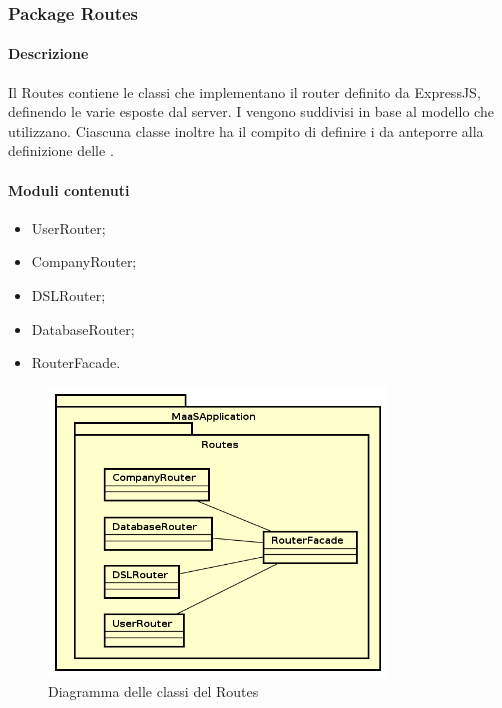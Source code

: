 \subsubsection{Package Routes}
\paragraph*{Descrizione}
Il  Routes contiene le classi che implementano il router definito da ExpressJS, definendo le varie  esposte dal server.
I  vengono suddivisi in base al modello che utilizzano. 
Ciascuna classe inoltre ha il compito di definire i  da anteporre alla definizione delle .\\

\paragraph*{Moduli contenuti}
\begin{itemize}
\item UserRouter;
\item CompanyRouter;
\item DSLRouter;
\item DatabaseRouter;
\item RouterFacade.
\end{itemize}

\begin{figure}[H]
\centering
\includegraphics[width=0.8\textwidth]{res/sections/backend/routes.png}
\caption{Diagramma delle classi del  Routes}
\end{figure}

